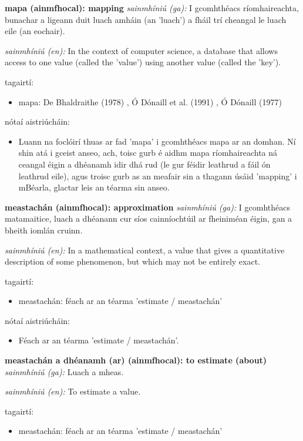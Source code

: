\documentclass{article}
\begin{document}
\textbf{mapa (ainmfhocal): mapping}
\textit{sainmhíniú (ga):} I gcomhthéacs ríomhaireachta, bunachar a ligeann duit luach amháin (an 'luach') a fháil trí cheangal le luach eile (an eochair).

\textit{sainmhíniú (en):} In the context of computer science, a database that allows access to one value (called the 'value') using another value (called the 'key').

tagairtí:
\begin{itemize}
	\item mapa: De Bhaldraithe (1978) \cite{de-bhaldraithe}, Ó Dónaill et al. (1991) \cite{focloir-beag}, Ó Dónaill (1977) \cite{odonaill}
\end{itemize}

nótaí aistriúcháin:
\begin{itemize}
	\item Luann na foclóirí thuas ar fad 'mapa' i gcomhthéacs mapa ar an domhan. Ní shin atá i gceist anseo, ach, toisc gurb é aidhm mapa ríomhaireachta ná ceangal éigin a dhéanamh idir dhá rud (le gur féidir leathrud a fáil ón leathrud eile), agus troisc gurb as an meafair sin a thagann úsáid 'mapping' i mBéarla, glactar leis an téarma sin anseo.
\end{itemize}


\textbf{meastachán (ainmfhocal): approximation}
\textit{sainmhíniú (ga):} I gcomhthéacs matamaitice, luach a dhéanann cur síos cainníochtúil ar fheiniméan éigin, gan a bheith iomlán cruinn.

\textit{sainmhíniú (en):} In a mathematical context, a value that gives a quantitative description of some phenomenon, but which may not be entirely exact.

tagairtí:
\begin{itemize}
	\item meastachán: féach ar an téarma 'estimate / meastachán'
\end{itemize}

nótaí aistriúcháin:
\begin{itemize}
	\item Féach ar an téarma 'estimate / meastachán'.
\end{itemize}


\textbf{meastachán a dhéanamh (ar) (ainmfhocal): to estimate (about)}
\textit{sainmhíniú (ga):} Luach a mheas.

\textit{sainmhíniú (en):} To estimate a value.

tagairtí:
\begin{itemize}
	\item meastachán: féach ar an téarma 'estimate  / meastachán'
\end{itemize}
\end{document}
